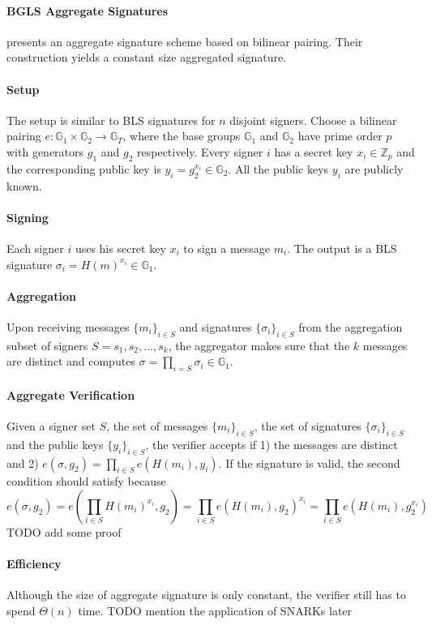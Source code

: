 \paragraph{BGLS Aggregate Signatures} \cite{DBLP:conf/eurocrypt/BonehGLS03} presents an aggregate signature scheme based on bilinear pairing. Their construction yields a constant size aggregated signature. 

\paragraph{Setup} The setup is similar to BLS signatures for $n$ disjoint signers. Choose a bilinear pairing $e:\mathbb{G}_1\times \mathbb{G}_2\to \mathbb{G}_T$, where the base groups $\mathbb{G}_1$ and $\mathbb{G}_2$ have prime order $p$ with generators $g_1$ and $g_2$ respectively. Every signer $i$ has a secret key $x_i\in \mathbb{Z}_p$ and the corresponding public key is $y_i = g_2^{x_i}\in \mathbb{G}_2$. All the public keys $y_i$ are publicly known. 

\paragraph{Signing} Each signer $i$ uses his secret key $x_i$ to sign a message $m_i$. The output is a BLS signature $\sigma_i = H(m)^{x_i}\in \mathbb{G}_1$.  

\paragraph{Aggregation} Upon receiving messages $\{m_i\}_{i\in S}$ and signatures $\{\sigma_i\}_{i\in S}$ from the aggregation subset of signers $S={s_1, s_2,\dots, s_k}$, the aggregator makes sure that the $k$ messages are distinct and computes $\sigma=\prod_{i=S} \sigma_i \in \mathbb{G}_1$. 

\paragraph{Aggregate Verification} Given a signer set $S$, the set of messages $\{m_i\}_{i\in S}$, the set of signatures $\{\sigma_i\}_{i\in S}$ and the public keys $\{y_i\}_{i\in S}$, the verifier accepts if 1) the messages are distinct and 2) $e(\sigma, g_2)=\prod_{i\in S}e(H(m_i), y_i)$. If the signature is valid, the second condition should satisfy because 
\begin{equation*}
    e(\sigma, g_2) = e(\prod_{i\in S}H(m_i)^{x_i}, g_2) = \prod_{i\in S} e(H(m_i), g_2)^{x_i} = \prod_{i\in S}e(H(m_i), g_2^{x_i}) %
\end{equation*}
{\color{red} TODO add some proof}

\paragraph{Efficiency} Although the size of aggregate signature is only constant, the verifier still has to spend $\Theta(n)$ time. {\color{red} TODO mention the application of SNARKs later}



